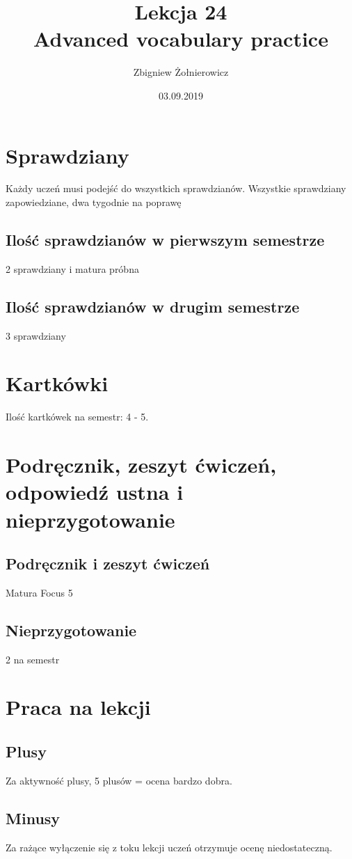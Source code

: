 \documentclass[a4paper]{article}
\begin{document}
\title{{\huge Lekcja 24} \\
{\large Advanced vocabulary practice}}
\author{Zbigniew Żołnierowicz}
\date{03.09.2019}
\maketitle
\section{Sprawdziany}
Każdy uczeń musi podejść do wszystkich sprawdzianów. Wszystkie sprawdziany zapowiedziane, dwa tygodnie na poprawę
\subsection{Ilość sprawdzianów w pierwszym semestrze}
2 sprawdziany i matura próbna
\subsection{Ilość sprawdzianów w drugim semestrze}
3 sprawdziany
\section{Kartkówki}
Ilość kartkówek na semestr: 4 - 5.
\section{Podręcznik, zeszyt ćwiczeń, odpowiedź ustna i nieprzygotowanie}
\subsection{Podręcznik i zeszyt ćwiczeń}
Matura Focus 5
\subsection{Nieprzygotowanie}
2 na semestr
\section{Praca na lekcji}
\subsection{Plusy}
Za aktywność plusy, 5 plusów = ocena bardzo dobra.
\subsection{Minusy}
Za rażące wyłączenie się z toku lekcji uczeń otrzymuje ocenę niedostateczną.
\end{document}
